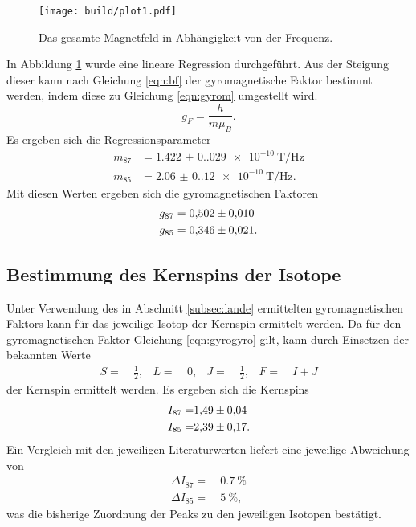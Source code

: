 \begin{figure}[H]
  \centering
  \texttt{[image: build/plot1.pdf]}
  \caption{Das gesamte Magnetfeld in Abhängigkeit von der Frequenz.}
  \label{fig:magnetfeld1}
\end{figure}
\noindent
In Abbildung \ref{fig:magnetfeld1} wurde eine lineare Regression durchgeführt.
Aus der Steigung dieser kann nach Gleichung \ref{eqn:bf} der gyromagnetische
Faktor bestimmt werden, indem diese zu Gleichung \ref{eqn:gyrom} umgestellt wird.
\begin{equation}
  g_{F} = \frac{h}{m \mu_{B}}.
  \label{eqn:gyrom}
\end{equation}
\noindent
Es ergeben sich die Regressionsparameter
\begin{align}
  m_{87}  & =  \SI{1.422(0.029)e-10}{\tesla\per\hertz}\\
  m_{85}  & =  \SI{2.06(0.12)e-10}{\tesla\per\hertz}.
\end{align}
\noindent
Mit diesen Werten ergeben sich die gyromagnetischen Faktoren
\begin{align}
	g_{87} & = \num{0.502+-0.01}\\
  g_{85} & = \num{0.346+-0.021}.
\end{align}
\noindent

\subsection{Bestimmung des Kernspins der Isotope}
\label{subsec:kernspin}
Unter Verwendung des in Abschnitt \ref{subsec:lande} ermittelten gyromagnetischen
Faktors kann für das jeweilige Isotop der Kernspin ermittelt werden. Da für den
gyromagnetischen Faktor Gleichung \ref{eqn:gyrogyro} gilt, kann durch Einsetzen
der bekannten Werte
\begin{align}
S =\ & \frac{1}{2}, & L =\ & 0, & J =\ & \frac{1}{2}, & F =\ & I + J
\end{align}
der Kernspin ermittelt werden. Es ergeben sich die Kernspins
\begin{align}
	I_{87} = & \num{1.49+-0.04} \\
  I_{85} = & \num{2.39+-0.17}.
\end{align}
Ein Vergleich mit den jeweiligen Literaturwerten \cite{Rb} liefert eine jeweilige Abweichung von
\begin{align}
  \Delta I_{87} =\ & \SI{0.7}{\percent} \\
  \Delta I_{85} =\ & \SI{5}{\percent},
\end{align}
was die bisherige Zuordnung der Peaks zu den jeweiligen Isotopen bestätigt.

